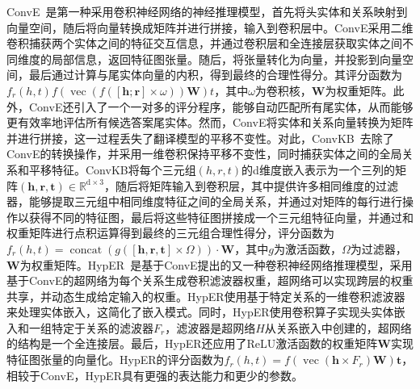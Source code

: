 \documentclass[algorithmlist, AutoFakeBold, AutoFakeSlant, figurelist, tablelist, nomlist, engineering]{seuthesix}
\begin{document}
ConvE~\cite{dettmers2018convolutional}是第一种采用卷积神经网络的神经推理模型，首先将头实体和关系映射到向量空间，随后将向量转换成矩阵并进行拼接，输入到卷积层中。ConvE采用二维卷积捕获两个实体之间的特征交互信息，并通过卷积层和全连接层获取实体之间不同维度的局部信息，返回特征图张量。随后，将张量转化为向量，并投影到向量空间，最后通过计算与尾实体向量的内积，得到最终的合理性得分。其评分函数为$f_r\left(h, t\right)f(\operatorname{vec}(f([\bm{h} ; \bm{r}] \times \omega)) \mathbf{W}) t$，其中$\omega$为卷积核，$\mathbf{W}$为权重矩阵。此外，ConvE还引入了一个一对多的评分程序，能够自动匹配所有尾实体，从而能够更有效率地评估所有候选答案尾实体。然而，ConvE将实体和关系向量转换为矩阵并进行拼接，这一过程丢失了翻译模型的平移不变性。对此，ConvKB~\cite{nguyen2018novel}去除了ConvE的转换操作，并采用一维卷积保持平移不变性，同时捕获实体之间的全局关系和平移特征。ConvKB将每个三元组$(h, r, t)$的d维度嵌入表示为一个三列的矩阵$(\bm{h}, \bm{r}, \bm{t}) \in \mathbb{R}^{\mathrm{d} \times 3}$，随后将矩阵输入到卷积层，其中提供许多相同维度的过滤器，能够提取三元组中相同维度特征之间的全局关系，并通过对矩阵的每行进行操作以获得不同的特征图，最后将这些特征图拼接成一个三元组特征向量，并通过和权重矩阵进行点积运算得到最终的三元组合理性得分，评分函数为$f_r(h, t)=\operatorname{concat}(g([\bm{h}, \bm{r}, \bm{t}] \times \Omega)) \cdot \mathbf{W}$，其中$g$为激活函数，$\Omega$为过滤器，$\mathbf{W}$为权重矩阵。HypER~\cite{balazevic2019hypernetwork}是基于ConvE提出的又一种卷积神经网络推理模型，采用基于ConvE的超网络为每个关系生成卷积滤波器权重，超网络可以实现跨层的权重共享，并动态生成给定输入的权重。HypER使用基于特定关系的一维卷积滤波器来处理实体嵌入，这简化了嵌入模式。同时，HypER使用卷积算子实现头实体嵌入和一组特定于关系的滤波器$F_r$，滤波器是超网络$H$从关系嵌入中创建的，超网络的结构是一个全连接层。最后，HypER还应用了ReLU激活函数的权重矩阵$\mathbf{W}$实现特征图张量的向量化。HypER的评分函数为$f_r(h, t)=f\left(\operatorname{vec}\left(\bm{h} \times F_r\right) \mathbf{W}\right) \bm{t}$，相较于ConvE，HypER具有更强的表达能力和更少的参数。
\end{document}
